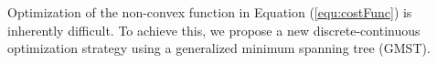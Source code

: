 Optimization of the non-convex function in Equation (\ref{equ:costFunc}) is inherently difficult. To achieve this, we propose a new discrete-continuous  optimization strategy using a generalized minimum spanning tree (GMST).

